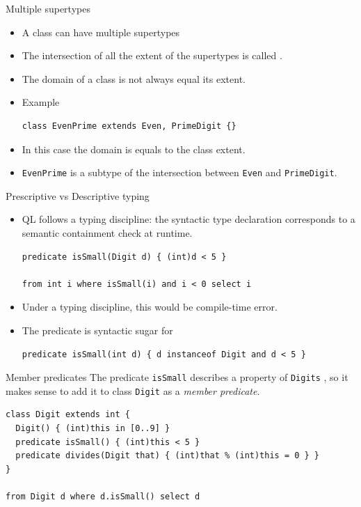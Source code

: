 \documentclass[usenames,dvipsnames]{beamer}
\begin{document}
\begin{frame}[fragile]{Multiple supertypes}
\begin{itemize}
\item A class can have multiple supertypes
\item The intersection of all the extent of the supertypes is called .
\item The domain of a class is not always equal its extent.
\item Example
\begin{lstlisting}[language=JastAdd]
class EvenPrime extends Even, PrimeDigit {}
\end{lstlisting}
\item In this case the domain is equals to the class extent.
\item \texttt{EvenPrime} is a subtype of the intersection between \texttt{Even} and \texttt{PrimeDigit}.
\end{itemize}
\end{frame}

\begin{frame}[fragile]{Prescriptive vs Descriptive typing}
\begin{itemize}
\item QL follows a  typing discipline: the syntactic type declaration corresponds to a semantic containment check at runtime.

\begin{lstlisting}[language=JastAdd]
predicate isSmall(Digit d) { (int)d < 5 }

from int i where isSmall(i) and i < 0 select i
\end{lstlisting}
\item Under a  typing discipline, this would be compile-time error.
\item The predicate is syntactic sugar for
\begin{lstlisting}[language=JastAdd]
predicate isSmall(int d) { d instanceof Digit and d < 5 }
\end{lstlisting}
\end{itemize}
\end{frame}

\begin{frame}[fragile]{Member predicates}
The predicate \texttt{isSmall} describes a property of \texttt{Digits} , so it makes sense to add it to class \texttt{Digit} as a \textit{member predicate}.
\begin{lstlisting}[language=JastAdd]
class Digit extends int {
  Digit() { (int)this in [0..9] }
  predicate isSmall() { (int)this < 5 }
  predicate divides(Digit that) { (int)that % (int)this = 0 } }
}

from Digit d where d.isSmall() select d
\end{lstlisting}
\end{frame}
\end{document}
